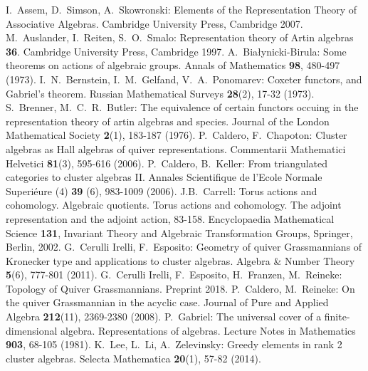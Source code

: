 \documentclass{amsart}
\numberwithin{equation}{section}
\begin{document}
\begin{thebibliography}{10}

  I.~Assem, D.~Simson, A.~Skowronski: Elements of the Representation Theory of Associative Algebras. Cambridge University Press, Cambridge 2007.
  M.~Auslander, I.~Reiten, S.~O.~Smalo: Representation theory of Artin algebras {\bf 36}. Cambridge University Press, Cambridge 1997.
  A.~Bia\l{}ynicki-Birula: Some theorems on actions of algebraic groups. Annals of Mathematics \textbf{98}, 480-497 (1973).
  I.~N.~Bernstein, I.~M.~Gelfand, V.~A.~Ponomarev: Coxeter functors, and Gabriel's theorem. Russian Mathematical Surveys \textbf{28}(2), 17-32 (1973).
  S.~Brenner, M.~C.~R.~Butler: The equivalence of certain functors occuing in the representation theory of artin algebras and species. Journal of the London Mathematical Society \textbf{2}(1), 183-187 (1976).
  P.~Caldero, F.~Chapoton: Cluster algebras as {H}all algebras of quiver representations. Commentarii Mathematici Helvetici \textbf{81}(3), 595-616 (2006).
  P.~Caldero, B.~Keller: From triangulated categories to cluster algebras II.  Annales Scientifique de l'Ecole Normale Superi\'{e}ure (4) \textbf{39} (6), 983-1009 (2006).
	J.B.~Carrell: Torus actions and cohomology. Algebraic quotients. Torus actions and cohomology. The adjoint representation and the adjoint action, 83-158. Encyclopaedia Mathematical Science \textbf{131}, Invariant Theory and Algebraic
Transformation Groups, Springer, Berlin, 2002.
  G.~Cerulli Irelli, F.~Esposito: Geometry of quiver Grassmannians of Kronecker type and applications to cluster algebras. Algebra \&  Number Theory \textbf{5}(6), 777-801 (2011).
  G.~Cerulli Irelli, F.~Esposito, H.~Franzen, M.~Reineke: Topology of Quiver Grassmannians. Preprint 2018.
  P.~Caldero, M.~Reineke: On the quiver Grassmannian in the acyclic case. Journal of Pure and Applied Algebra \textbf{212}(11), 2369-2380 (2008).
  P.~Gabriel: The universal cover of a finite-dimensional algebra. Representations of algebras. Lecture Notes in Mathematics {\bf 903}, 68-105 (1981).
  K.~Lee, L.~Li, A.~Zelevinsky: Greedy elements in rank 2 cluster algebras. Selecta Mathematica \textbf{20}(1), 57-82 (2014).

\end{thebibliography}
\end{document}
